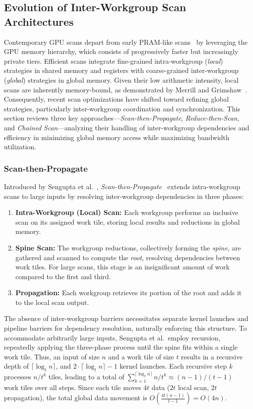\documentclass[sigconf,screen]{acmart}
\begin{document}
\subsection{Evolution of Inter-Workgroup Scan Architectures}
\label{sec:Evolution}
Contemporary GPU scans depart from early PRAM-like scans~\cite{Horn, Hensley, Sengupta2006, Gress} by leveraging the GPU memory hierarchy, which consists of progressively faster but increasingly private tiers. Efficient scans integrate fine-grained intra-workgroup (\emph{local}) strategies in shared memory and registers with coarse-grained inter-workgroup (\emph{global}) strategies in global memory. Given their low arithmetic intensity, local scans are inherently memory-bound, as demonstrated by Merrill and Grimshaw~\cite{Merrill2009}. Consequently, recent scan optimizations have shifted toward refining global strategies, particularly inter-workgroup coordination and synchronization. This section reviews three key approaches---\emph{Scan-then-Propagate}, \emph{Reduce-then-Scan}, and \emph{Chained Scan}---analyzing their handling of inter-workgroup dependencies and efficiency in minimizing global memory access while maximizing bandwidth utilization.

\subsubsection{Scan-then-Propagate}
Introduced by Sengupta et al.~\cite{10.5555/1280094.1280110}, \emph{Scan-then-Propagate}~\cite{GPUGems3, Sengupta2011} extends intra-workgroup scans to large inputs by resolving inter-workgroup dependencies in three phases:
\begin{enumerate}
  \item \textbf{Intra-Workgroup (Local) Scan:}  Each workgroup performs an inclusive scan on its assigned work tile, storing local results and reductions in global memory.
  \item \textbf{Spine Scan:} The workgroup reductions, collectively forming the \emph{spine}, are gathered and scanned to compute the \emph{root}, resolving dependencies between work tiles. For large scans, this stage is an insignificant amount of work compared to the first and third.
  \item \textbf{Propagation:} Each workgroup retrieves its portion of the root and adds it to the local scan output.
\end{enumerate}
The absence of inter-workgroup barriers necessitates separate kernel launches and pipeline barriers for dependency resolution, naturally enforcing this structure. To accommodate arbitrarily large inputs, Sengupta et al.\ employ recursion, repeatedly applying the three-phase process until the spine fits within a single work tile. Thus, an input of size $n$ and a work tile of size $t$ results in a recursive depth of $\lceil \log_t n \rceil$, and $2\cdot\lceil \log_t n \rceil - 1$ kernel launches. Each recursive step $k$ processes $n/t^k$ tiles, leading to a total of $\sum_{k=1}^{\lceil \log_t n \rceil} n/t^k \approx (n - 1)/(t - 1)$ work tiles over all steps. Since each tile moves $4t$ data ($2t$ local scan, $2t$ propagation), the total global data movement is $O\left(\frac{4t(n - 1)}{t - 1}\right) = O(4n)$.
\end{document}
